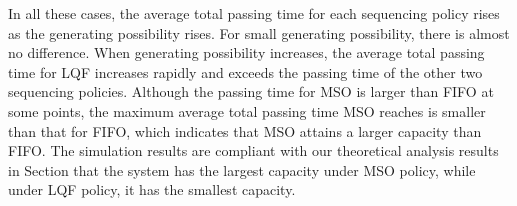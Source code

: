 \documentclass{article}
\begin{document}

In all these cases, the average total passing time for each sequencing policy rises as the generating possibility rises. For small generating possibility, there is almost no difference. When generating possibility increases, the average total passing time for LQF increases rapidly and exceeds the passing time of the other two sequencing policies. Although the passing time for MSO is larger than FIFO at some points, the maximum average total passing time MSO reaches is smaller than that for FIFO, which indicates that MSO attains a larger capacity than FIFO. The simulation results are compliant with our theoretical analysis results in Section  that the system has the largest capacity under MSO policy, while under LQF policy, it has the smallest capacity. 
\end{document}
